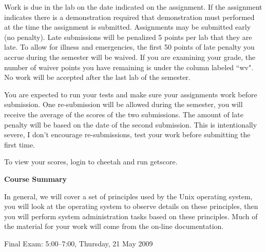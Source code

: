 Work is due in the lab on the date indicated on the assignment.
If the assignment indicates there is a demonstration required
that demonstration must performed at the time the assignment is submitted.
Assignments may be submitted early (no penalty).
Late submissions will be penalized 5 points per lab that they are late.
To allow for illness and emergencies,
the first 50 points of late penalty you
accrue during the semester will be waived.
If you are examining your grade, the number of waiver points you have
remaining is under the column labeled ``{\ltt{}wv}".
No work will be accepted after the last lab of the semester.

You are expected to run your tests and make sure your assignments work
before submission.
One re-submission will be allowed during the semester, you will receive
the average of the scores of the two submissions. The amount of late
penalty will be based on the date of the second submission.
This is intentionally severe, I don't encourage re-submissions, test your
work before submitting the first time.

To view your scores, login to {\ltt{}cheetah} and run {\ltt{}getscore}.

\vskip 5pt
\centerline{\bf Course Summary}

In general, we will cover a set of principles used by the Unix operating system,
you will look at the operating system to observe details on these principles,
then you will perform system administration tasks based on these principles.
Much of the material for your work will come from the on-line documentation.

\vskip 5pt
Final Exam: 
5:00--7:00, Thursday, 21 May 2009

\def\week#1{\par\hangindent 0.7in {\indent\llap{\bf #1 \enspace}
\ignorespaces}}

\bye

